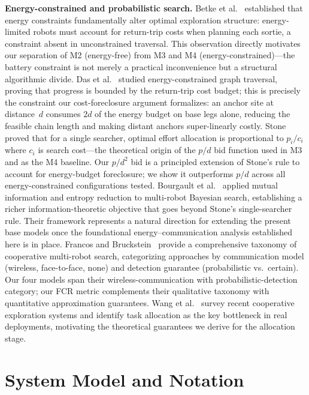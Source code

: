\documentclass[conference]{IEEEtran}
\begin{document}
\textbf{Energy-constrained and probabilistic search.}
Betke et al.~\cite{Betke1995} established that energy constraints
fundamentally alter optimal exploration structure: energy-limited robots must
account for return-trip costs when planning each sortie, a constraint absent
in unconstrained traversal.
This observation directly motivates our separation of M2 (energy-free) from
M3 and M4 (energy-constrained)---the battery constraint is not merely a
practical inconvenience but a structural algorithmic divide.
Das et al.~\cite{Das2017} studied energy-constrained graph traversal,
proving that progress is bounded by the return-trip cost budget; this is
precisely the constraint our cost-foreclosure argument formalizes: an anchor
site at distance~$d$ consumes $2d$ of the energy budget on base legs alone,
reducing the feasible chain length and making distant anchors
super-linearly costly.
Stone~\cite{Stone1975} proved that for a single searcher, optimal effort
allocation is proportional to $p_i / c_i$ where $c_i$ is search cost---the
theoretical origin of the $p/d$ bid function used in M3 and as the M4
baseline.
Our $p/d^2$ bid is a principled extension of Stone's rule to account for
energy-budget foreclosure; we show it outperforms $p/d$ across all
energy-constrained configurations tested.
Bourgault et al.~\cite{Bourgault2003} applied mutual information and entropy
reduction to multi-robot Bayesian search, establishing a richer
information-theoretic objective that goes beyond Stone's single-searcher
rule.
Their framework represents a natural direction for extending the present
base models once the foundational energy--communication analysis established
here is in place.
Francos and Bruckstein~\cite{Francos2023} provide a comprehensive taxonomy
of cooperative multi-robot search, categorizing approaches by communication
model (wireless, face-to-face, none) and detection guarantee (probabilistic
vs.\ certain).
Our four models span their wireless-communication with probabilistic-detection
category; our FCR metric complements their qualitative taxonomy with
quantitative approximation guarantees.
Wang et al.~\cite{Wang2025} survey recent cooperative exploration systems
and identify task allocation as the key bottleneck in real deployments,
motivating the theoretical guarantees we derive for the allocation stage.

\section{System Model and Notation}\label{sec:model}
\end{document}
